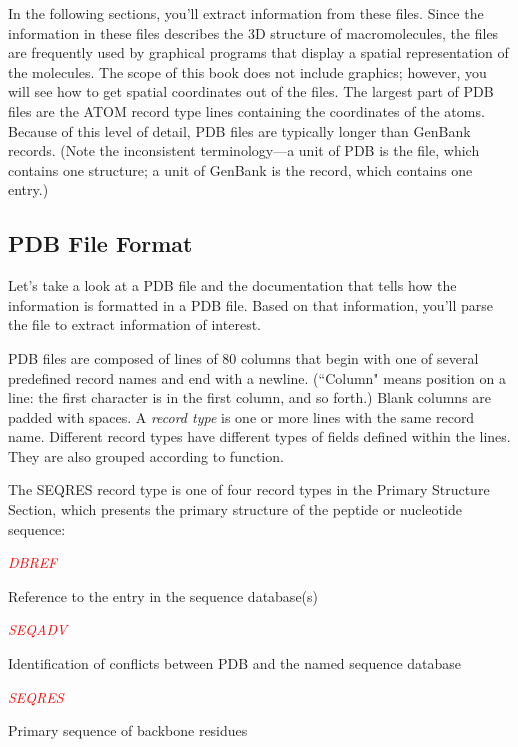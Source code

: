 In the following sections, you'll extract information from these files. Since the information in these files describes the 3D structure of macromolecules, the files are frequently used by graphical programs that display a spatial representation of the molecules. The scope of this book does not include graphics; however, you will see how to get spatial coordinates out of the files. The largest part of PDB files are the ATOM record type lines containing the coordinates of the atoms. Because of this level of detail, PDB files are typically longer than GenBank records. (Note the inconsistent terminology—a unit of PDB is the file, which contains one structure; a unit of GenBank is the record, which contains one entry.) 

\subsection{PDB File Format}
Let's take a look at a PDB file and the documentation that tells how the information is formatted in a PDB file. Based on that information, you'll parse the file to extract information of interest.

PDB files are composed of lines of 80 columns that begin with one of several predefined record names and end with a newline. (``Column" means position on a line: the first character is in the first column, and so forth.) Blank columns are padded with spaces. A \textit{record type} is one or more lines with the same record name. Different record types have different types of fields defined within the lines. They are also grouped according to function.

The SEQRES record type is one of four record types in the Primary Structure Section, which presents the primary structure of the peptide or nucleotide sequence: 

\textcolor{red}{\textit{DBREF}}
\begin{adjustwidth}{2em}{}
Reference to the entry in the sequence database(s)
\end{adjustwidth}

\textcolor{red}{\textit{SEQADV}}
\begin{adjustwidth}{2em}{}
Identification of conflicts between PDB and the named sequence database 
\end{adjustwidth}

\textcolor{red}{\textit{SEQRES}}
\begin{adjustwidth}{2em}{}
Primary sequence of backbone residues 
\end{adjustwidth}

